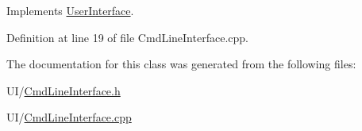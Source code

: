Implements \hyperlink{class_user_interface_a4f637eb516dc7dc59cbfba43b85a81ff}{User\+Interface}.



Definition at line 19 of file Cmd\+Line\+Interface.\+cpp.



The documentation for this class was generated from the following files\+:\begin{DoxyCompactItemize}
\item 
U\+I/\hyperlink{_cmd_line_interface_8h}{Cmd\+Line\+Interface.\+h}\item 
U\+I/\hyperlink{_cmd_line_interface_8cpp}{Cmd\+Line\+Interface.\+cpp}\end{DoxyCompactItemize}
